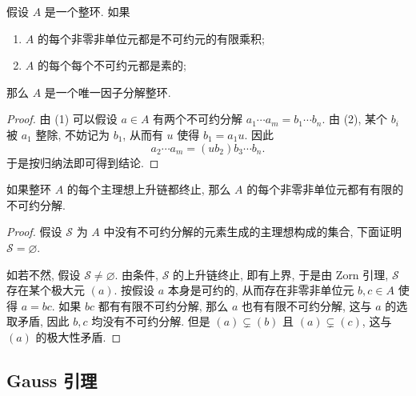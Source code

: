 \begin{proposition}
  假设 \( A \) 是一个整环. 如果
  \begin{enumerate}
    \item \( A \) 的每个非零非单位元都是不可约元的有限乘积;
    \item \( A \) 的每个每个不可约元都是素的;
  \end{enumerate}
  那么 \( A \) 是一个唯一因子分解整环.
\end{proposition}
\begin{proof}
  由 (1) 可以假设 \( a \in A \) 有两个不可约分解 \( a_1 \cdots a_m = b_1 \cdots
  b_n \).
  由 (2), 某个 \( b_i \) 被 \( a_1 \) 整除, 不妨记为 \( b_1 \), 从而有
  \( u \) 使得 \( b_1 = a_1 u \). 因此
  \[
    a_2 \cdots a_m = (ub_2)b_3 \cdots b_n.
  \]
  于是按归纳法即可得到结论.
\end{proof}

\begin{proposition}
  如果整环 \( A \) 的每个主理想上升链都终止, 那么 \( A \)
  的每个非零非单位元都有有限的不可约分解.
\end{proposition}
\begin{proof}
  假设 \( \mathcal{S} \) 为 \( A \)
  中没有不可约分解的元素生成的主理想构成的集合, 下面证明 \( \mathcal{S} =
  \varnothing \).

  如若不然, 假设 \( \mathcal{S} \neq \varnothing \).
  由条件, \( \mathcal{S} \) 的上升链终止, 即有上界, 于是由 Zorn 引理, \(
  \mathcal{S} \) 存在某个极大元 \( (a) \).
  按假设 \( a \) 本身是可约的, 从而存在非零非单位元 \( b, c \in A \) 使得 \( a =
  bc \).
  如果 \( bc \) 都有有限不可约分解, 那么 \( a \) 也有有限不可约分解,
  这与 \( a \) 的选取矛盾, 因此 \( b, c \) 均没有不可约分解.
  但是 \( (a) \subsetneq(b) \) 且 \( (a) \subsetneq(c) \), 这与 \( (a) \)
  的极大性矛盾.
\end{proof}

\subsection{Gauss 引理}

